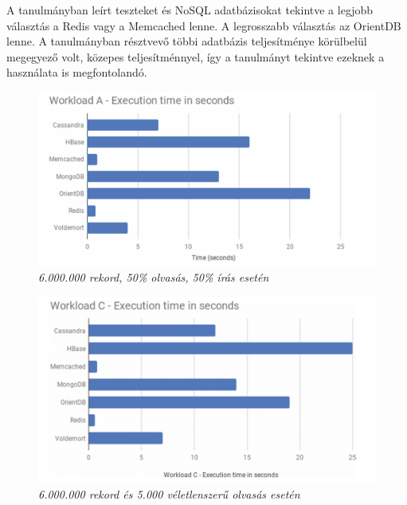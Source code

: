 A tanulmányban leírt teszteket és NoSQL adatbázisokat tekintve a legjobb választás a Redis vagy a Memcached lenne. A legrosszabb választás az OrientDB lenne. A tanulmányban résztvevő többi adatbázis teljesítménye körülbelül megegyező volt, közepes teljesítménnyel, így a tanulmányt tekintve ezeknek a használata is megfontolandó.

\begin{figure}[H]
	\centering
	\includegraphics[width=0.9\linewidth]{figures/images/performance_a.png}
	\caption[6.000.000 rekord, 50\% olvasás, 50\% írás esetén]{\textit{6.000.000 rekord, 50\% olvasás, 50\% írás esetén}\footnotemark}
	\label{fig:performance_a}
\end{figure}


\begin{figure}[H]
	\centering
	\includegraphics[width=0.9\linewidth]{figures/images/performance_b.png}
	\caption[6.000.000 rekord és 5.000 véletlenszerű olvasás esetén]{\textit{6.000.000 rekord és 5.000 véletlenszerű olvasás esetén}\footnotemark}
	\label{fig:performance_b}
\end{figure}


